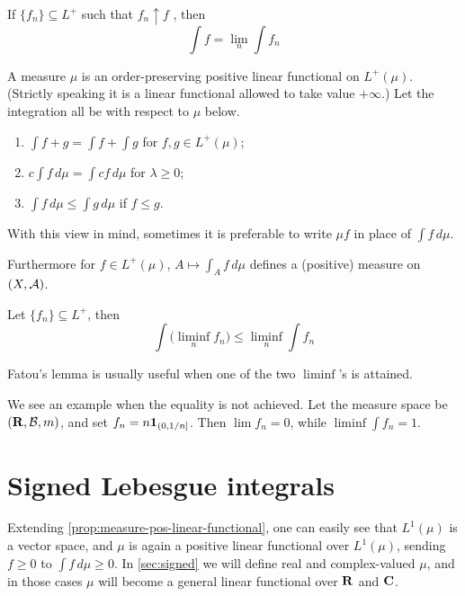 \begin{namedthm} \label{thm:MCT}
    If $\{f_n\} \subseteq L^+$ such that $f_n \uparrow f$ , then \[
        \int f = \lim_n \int f_n
    \]
\end{namedthm}

\begin{prop} \label{prop:measure-pos-linear-functional}
A measure $\mu$ is an order-preserving positive linear functional on $L^+(\mu)$. (Strictly speaking it is a linear functional allowed to take value $+\infty$.) Let the integration all be with respect to $\mu$ below.
\begin{enumerate}
    \item $\int f + g = \int f  + \int g$ for $f,g\in L^+(\mu)$;
    \item $c\int f \,d\mu= \int cf\,d\mu$ for $\lambda \geq 0$;
    \item $\int f\,d\mu \leq \int g\,d\mu$ if $f \leq g$.
\end{enumerate}
\end{prop}

With this view in mind, sometimes it is preferable to write $\mu f$ in place of $\int f\,d\mu$.

Furthermore for $f \in L^+(\mu)$, $A \mapsto \int_A f\,d\mu$ defines a (positive) measure on $(X,\mathcal{A})$.


\begin{namedthm} \label{thm:Fatou}
    Let $\{f_n\}\subseteq L^+$, then \[
        \int \bigl(\liminf_n f_n\bigr) \leq \liminf_n \int f_n
    \]
\end{namedthm}

Fatou's lemma is usually useful when one of the two $\liminf$'s is attained.

We see an example when the equality is not achieved. Let the measure space be $(\mathbf{R},\mathcal{B},m)$, and set $f_n = n \mathbf{1}_{(0,1/n]}$. Then $\lim f_n = 0$, while $\liminf \int f_n = 1$.


\section{Signed Lebesgue integrals}

Extending \cref{prop:measure-pos-linear-functional}, one can easily see that $L^1(\mu)$ is a vector space, and $\mu$ is again a positive linear functional over $L^1(\mu)$, sending $f \geq 0$ to $\int f\,d\mu \geq 0$. In \cref{sec:signed} we will define real and complex-valued $\mu$, and in those cases $\mu$ will become a general linear functional over $\mathbf{R}$ and $\mathbf{C}$.

